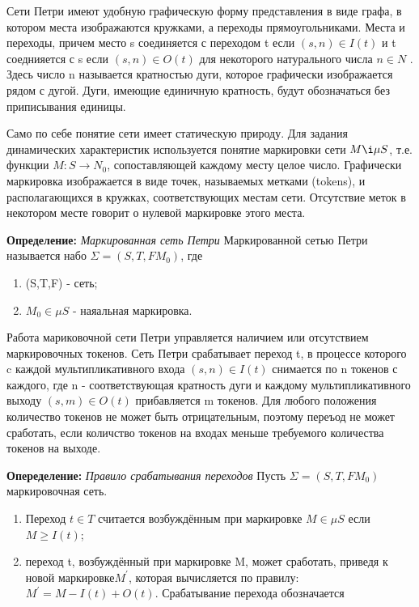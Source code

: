 \documentclass[a4paper,14pt]{article}
\begin{document}
Сети Петри имеют удобную графическую форму представления в виде графа, в котором места изображаются кружками, а переходы прямоугольниками. Места и переходы, причем место s соединяется с переходом t если $(s,n) \in I(t)$ и t соеднияется с s если $(s,n) \in O(t)$  для некоторого натурального числа $n \in N$ . Здесь число n называется кратностью дуги, которое графически изображается рядом с дугой. Дуги, имеющие единичную кратность, будут обозначаться без приписывания единицы.

Само по себе понятие сети имеет статическую природу. Для задания динамических характеристик используется понятие маркировки сети $M \i \mu S$, т.е. функции $M : S \longrightarrow N_{0}$, сопоставляющей каждому месту целое число. Графически маркировка изображается в виде точек, называемых метками (tokens), и располагающихся в кружках, соответствующих местам сети. Отсутствие меток в некотором месте говорит о нулевой маркировке этого места.

\textbf{Определение:}  \textit{Маркированная сеть Петри}
Маркированной сетью Петри называется набо $\Sigma = (S,T,F M_{0})$, где
\begin{enumerate}
\item (S,T,F) - сеть;
\item $M_{0} \in  \mu S$ - наяальная маркировка.
\end{enumerate}

Работа мариковочной сети Петри управляется наличием или отсутствием маркировочных токенов. Сеть Петри срабатывает  переход t, в процессе которого c каждой  мультипликативного входа $(s, n) \in I(t)$ снимается по n токенов с каждого, где n - соответствующая кратность дуги и каждому мультипликативного выходу $(s, m) \in O(t)$ прибавляется m токенов.
Для любого положения количество токенов не может быть отрицательным, поэтому переъод не может сработать, если количство токенов на входах меньше требуемого количества токенов на выходе. 

\textbf{Опеределение: } \textit{Правило срабатывания переходов}
Пусть $\Sigma = (S,T,F M_{0})$ маркировочная сеть.
\begin{enumerate}
\item Переход $t \in T$ считается возбуждённым при маркировке $M \in \mu S$ если $M \geq I(t)$;
\item переход t, возбуждённый при маркировке M,  может сработать, приведя к новой маркировке$M^{'}$,  которая вычисляется по правилу: $M^{'} = M - I(t) + O(t)$. Срабатывание перехода обозначается 
\end{enumerate}
\end{document}
